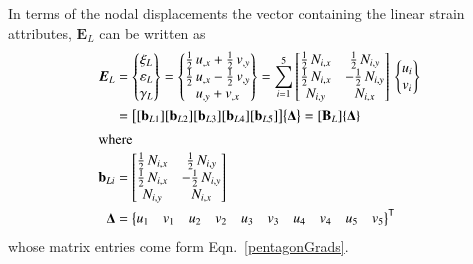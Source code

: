In terms of the nodal displacements the vector containing the linear strain attributes, $\boldsymbol{E}_L$ can be written as
\begin{subequations}
    \begin{align}
    \boldsymbol{E}_L & = \begin{Bmatrix}
    \xi_{L} \\
    \varepsilon_{L} \\
    \gamma_{L} \end{Bmatrix} = 
    \begin{Bmatrix}
    \tfrac{1}{2} \, u_{,x} + \tfrac{1}{2} \, v_{,y} \\
    \tfrac{1}{2} \, u_{,x} - \tfrac{1}{2} \, v_{,y} \\
    u_{,y} + v_{,x} \end{Bmatrix} = 
    \sum_{i=1}^5 \begin{bmatrix}
    \tfrac{1}{2} \, N_{i,x} & \tfrac{1}{2} \, N_{i,y}  \\
    \tfrac{1}{2} \, N_{i,x} & -\tfrac{1}{2} \, N_{i,y} \\ 
    N_{i,y} & N_{i,x}  \end{bmatrix} \, 
    \begin{Bmatrix}
    u_{i} \\
    v_{i} 
    \end{Bmatrix} \notag \\
    & = \bigl[ [\mathbf{b}_{L1}] [\mathbf{b}_{L2}] [\mathbf{b}_{L3}] 
    [\mathbf{b}_{L4}] [\mathbf{b}_{L5}] \bigr]
    \bigl\{ \boldsymbol{\Delta} \bigr\}  
    = [\mathbf{B}_L] \{ \boldsymbol{\Delta} \} \\
    \intertext{where}
    \mathbf{b}_{Li} & = \begin{bmatrix}
    \tfrac{1}{2} \, N_{i,x}  &  \tfrac{1}{2} \, N_{i,y} \\
    \tfrac{1}{2} \, N_{i,x}  & - \tfrac{1}{2} \, N_{i,y} \\
    N_{i,y} & N_{i,x} 
    \end{bmatrix} \\
    \boldsymbol{\Delta} & = \bigl\{ \begin{matrix}
    u_1 & v_1 & u_2 & v_2 & u_3 & v_3 & u_4 & v_4 & u_5 & v_5 
    \end{matrix} \bigr\}^{\mathsf{T}}
    \end{align}
\end{subequations}
whose matrix entries come form Eqn.~\eqref{pentagonGrads}.

